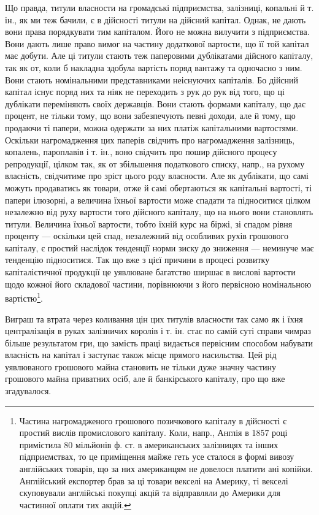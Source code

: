 Що правда, титули власности на громадські підприємства, залізниці,
копальні й т. ін., як ми теж бачили, є в дійсності титули на дійсний капітал.
Однак, не дають вони права порядкувати тим капіталом. Його не можна вилучити
з підприємства. Вони дають лише право вимог на частину додаткової вартости,
що її той капітал має добути. Але ці титули стають теж паперовими
дублікатами дійсного капіталу, так як от, коли б накладна здобула вартість
поряд вантажу та одночасно з ним. Вони стають номінальними представниками
неіснуючих капіталів. Бо дійсний капітал існує поряд них та ніяк не переходить
з рук до рук від того, що ці дублікати переміняють своїх державців. Вони стають
формами капіталу, що дає процент, не тільки тому, що вони забезпечують певні
доходи, але й тому, що продаючи ті папери, можна одержати за них платіж
капітальними вартостями. Оскільки нагромадження цих паперів свідчить про
нагромадження залізниць, копалень, пароплавів і т. ін., воно свідчить про пошир
дійсного процесу репродукції, цілком так, як от збільшення податкового списку,
напр., на рухому власність, свідчитиме про зріст цього роду власности. Але як
дублікати, що самі можуть продаватись як товари, отже й самі обертаються як
капітальні вартості, ті папери ілюзорні, а величина їхньої вартости може спадати
та підноситися цілком незалежно від руху вартости того дійсного капіталу, що
на нього вони становлять титули. Величина їхньої вартости, тобто їхній курс на
біржі, зі спадом рівня проценту — оскільки цей спад, незалежний від особливих
рухів грошового капіталу, є простий наслідок тенденції норми зиску до зниження
— неминуче має тенденцію підноситися. Так що вже з цієї причини
в процесі розвитку капіталістичної продукції це уявлюване багатство ширшає
в вислові вартости щодо кожної його складової частини, порівнюючи з його первісною
номінальною вартістю\footnote{
Частина нагромадженого грошового позичкового капіталу в дійсності є простий вислів промислового
капіталу. Коли, напр., Англія в 1857 році примістила 80 мільйонів ф. ст. в американських залізницях
та інших підприємствах, то це приміщення майже геть усе сталося в формі вивозу англійських товарів,
що за них американцям не довелося платити ані копійки. Англійський експортер брав за ці товари
векселі на Америку, ті векселі скуповували англійські покупці акцій та відправляли до Америки для
частинної оплати тих акцій.
}.

Виграш та втрата через коливання цін цих титулів власности так само як
і їхня централізація в руках залізничих королів і т. ін. стає по самій суті справи
чимраз більше результатом гри, що замість праці видається первісним способом
набувати власність на капітал і заступає також місце прямого насильства. Цей рід
уявлюваного грошового майна становить не тільки дуже значну частину грошового
майна приватних осіб, але й банкірського капіталу, про що вже згадувалося.

